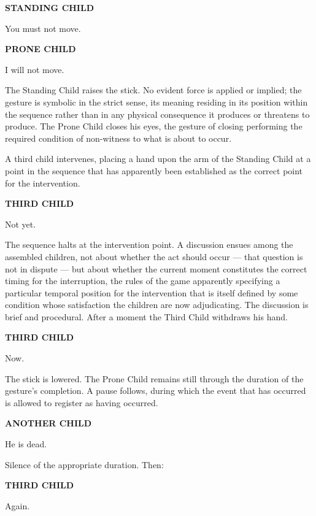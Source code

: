 \documentclass[12pt, oneside]{article}
\newenvironment{action}{%
  \vspace{0.6em}%
  \noindent\ignorespaces%
}{%
  \par\vspace{0.6em}%
}
\newcommand{\character}[1]{%
  \vspace{0.8em}%
  \begin{center}%
    \bfseries\MakeUppercase{#1}%
  \end{center}%
  \vspace{-0.3em}%
}
\newenvironment{dialogue}{%
  \vspace{0.2em}%
  \begin{list}{}{%
    \setlength{\leftmargin}{1.2in}%
    \setlength{\rightmargin}{0.8in}%
    \setlength{\itemsep}{0.6em}%
    \setlength{\parsep}{0pt}%
  }%
}{%
  \end{list}%
  \vspace{0.4em}%
}
\newcommand{\says}[2]{%
  \character{#1}%
  \begin{dialogue}\item #2\end{dialogue}%
}
\begin{document}
\says{Standing Child}{You must not move.}

\says{Prone Child}{I will not move.}

\begin{action}
The Standing Child raises the stick. No evident force is applied or implied; the gesture is symbolic in the strict sense, its meaning residing in its position within the sequence rather than in any physical consequence it produces or threatens to produce. The Prone Child closes his eyes, the gesture of closing performing the required condition of non-witness to what is about to occur.

A third child intervenes, placing a hand upon the arm of the Standing Child at a point in the sequence that has apparently been established as the correct point for the intervention.
\end{action}

\says{Third Child}{Not yet.}

\begin{action}
The sequence halts at the intervention point. A discussion ensues among the assembled children, not about whether the act should occur --- that question is not in dispute --- but about whether the current moment constitutes the correct timing for the interruption, the rules of the game apparently specifying a particular temporal position for the intervention that is itself defined by some condition whose satisfaction the children are now adjudicating. The discussion is brief and procedural. After a moment the Third Child withdraws his hand.
\end{action}

\says{Third Child}{Now.}

\begin{action}
The stick is lowered. The Prone Child remains still through the duration of the gesture's completion. A pause follows, during which the event that has occurred is allowed to register as having occurred.
\end{action}

\says{Another Child}{He is dead.}

\begin{action}
Silence of the appropriate duration. Then:
\end{action}

\says{Third Child}{Again.}
\end{document}
